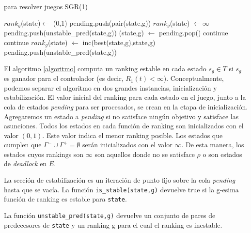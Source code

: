 \begin{algorithm}
\caption{para resolver juegos SGR(1)}\label{algoritmo}
\begin{algorithmic}[1]
        \State $rank_g$(state)$\gets$ (0,1)
    \EndFor
\EndFor
{}
        \State pending.push(pair(state,g))
    \EndIf
            \State $rank_g$(state) $\gets \infty$
            \State pending.push(unstable\_pred(state,g))
        \EndFor
    \EndIf
\EndFor
{}
    \State (state,g) $\gets$ pending.pop()
        \State continue
    \EndIf
        \State continue
    \EndIf
    \State $rank_g$(state) $\gets$ inc(best(state,g),state,g)
    \State pending.push(unstable\_pred(state,g))
\EndWhile
\EndProcedure
\end{algorithmic}
\end{algorithm}


El algoritmo \ref{algoritmo} computa un ranking estable en cada estado $s_g \in T$ si $s_g$ es ganador para el
controlador (es decir, $R_1(t)<\infty$). Conceptualmente, podemos separar el algoritmo en dos grandes instancias,
inicialización y estabilización. El valor inicial del ranking para cada estado en el juego, junto a la cola de
estados \emph{pending} para ser procesados, se crean en la etapa de inicialización. Agregaremos un estado a
\emph{pending} si no satisface ningún objetivo y satisface las asunciones. Todos los estados en cada función de ranking
son inicializados con el valor $(0,1)$. Este valor indica el menor ranking posible. Los estados que cumplen que
$\Gamma^- \cup \Gamma^+ = \emptyset$ serán inicializados con el valor $\infty$. De esta manera, los estados cuyos
rankings son $\infty$ son aquellos donde no se satisface $\rho$ o son estados de \emph{deadlock} en $E$.

La sección de estabilización es un iteración de punto fijo sobre la cola \emph{pending} hasta que se vacía. La función
\texttt{is\_stable(state,g)} devuelve true si la g-esima función de ranking es estable para \texttt{state}.

La función \texttt{unstable\_pred(state,g)} devuelve un conjunto de pares de predecesores de \texttt{state} y un
ranking g para el cual el ranking es inestable.

